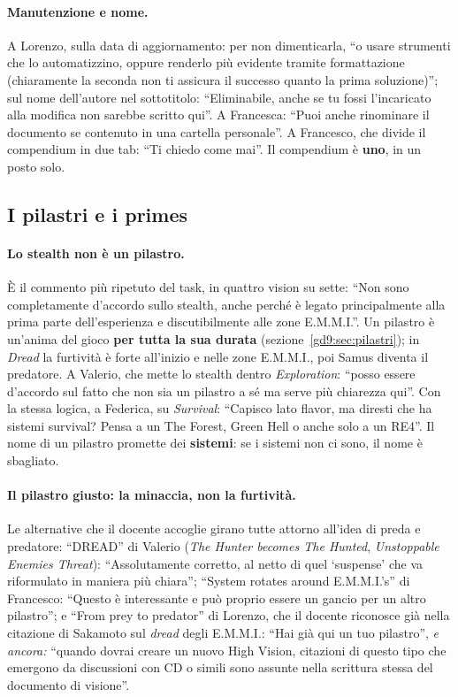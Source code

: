 \paragraph{Manutenzione e nome.} A Lorenzo, sulla data di aggiornamento: per
non dimenticarla, ``o usare strumenti che lo automatizzino, oppure renderlo
più evidente tramite formattazione (chiaramente la seconda non ti assicura il
successo quanto la prima soluzione)''; sul nome dell'autore nel sottotitolo:
``Eliminabile, anche se tu fossi l'incaricato alla modifica non sarebbe
scritto qui''. A Francesca: ``Puoi anche rinominare il documento se contenuto
in una cartella personale''. A Francesco, che divide il compendium in due
tab: ``Ti chiedo come mai''. Il compendium è \textbf{uno}, in un posto solo.

\subsection{I pilastri e i primes}
\label{rv:t5:sec:pilastri}

\paragraph{Lo stealth non è un pilastro.} È il commento più ripetuto del task,
in quattro vision su sette: ``Non sono completamente d'accordo sullo stealth,
anche perché è legato principalmente alla prima parte dell'esperienza e
discutibilmente alle zone E.M.M.I.''. Un pilastro è un'anima del gioco
\textbf{per tutta la sua durata} (sezione~\ref{gd9:sec:pilastri}); in
\emph{Dread} la furtività è forte all'inizio e nelle zone E.M.M.I., poi Samus
diventa il predatore. A Valerio, che mette lo stealth dentro
\emph{Exploration}: ``posso essere d'accordo sul fatto che non sia un
pilastro a sé ma serve più chiarezza qui''. Con la stessa logica, a Federica,
su \emph{Survival}: ``Capisco lato flavor, ma diresti che ha sistemi
survival? Pensa a un The Forest, Green Hell o anche solo a un RE4''. Il nome
di un pilastro promette dei \textbf{sistemi}: se i sistemi non ci sono, il
nome è sbagliato.

\paragraph{Il pilastro giusto: la minaccia, non la furtività.} Le alternative
che il docente accoglie girano tutte attorno all'idea di preda e predatore:
``DREAD'' di Valerio (\emph{The Hunter becomes The Hunted}, \emph{Unstoppable
Enemies Threat}): ``Assolutamente corretto, al netto di quel `suspense' che
va riformulato in maniera più chiara''; ``System rotates around E.M.M.I.'s''
di Francesco: ``Questo è interessante e può proprio essere un gancio per un
altro pilastro''; e ``From prey to predator'' di Lorenzo, che il docente
riconosce già nella citazione di Sakamoto sul \emph{dread} degli E.M.M.I.:
``Hai già qui un tuo pilastro'', \emph{e ancora:} ``quando dovrai creare un
nuovo High Vision, citazioni di questo tipo che emergono da discussioni con
CD o simili sono assunte nella scrittura stessa del documento di visione''.

